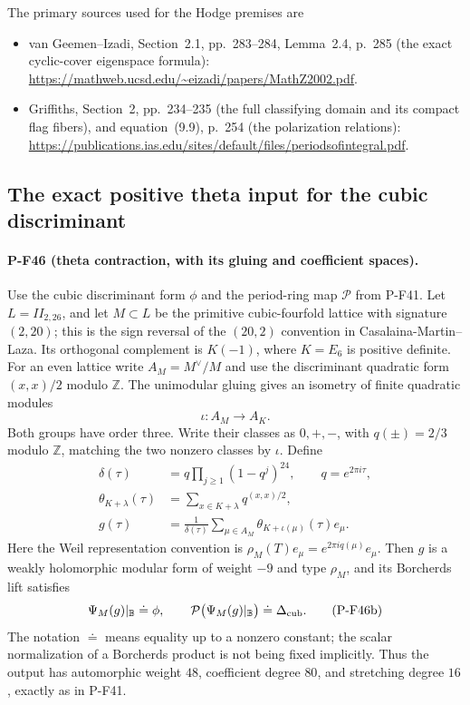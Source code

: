 \documentclass[11pt,a4paper]{article}
\begin{document}
The primary sources used for the Hodge premises are
\begin{itemize}
\item van Geemen--Izadi, Section~2.1, pp.~283--284,
Lemma~2.4, p.~285 (the exact cyclic-cover eigenspace formula):
\url{https://mathweb.ucsd.edu/~eizadi/papers/MathZ2002.pdf}.
\item Griffiths, Section~2, pp.~234--235 (the full classifying
domain and its compact flag fibers), and equation~(9.9),
p.~254 (the polarization relations):
\url{https://publications.ias.edu/sites/default/files/periodsofintegral.pdf}.
\end{itemize}


\subsection{The exact positive theta input for the cubic discriminant}
\label{sec:theta-input}

\paragraph{P-F46 (theta contraction, with its gluing and coefficient spaces).}
Use the cubic discriminant form $\phi$ and the period-ring map
$\mathcal P$ from P-F41. Let $L=II_{2,26}$, and let
$M\subset L$ be the primitive cubic-fourfold lattice with
signature $(2,20)$; this is the sign reversal of the
$(20,2)$ convention in Casalaina-Martin--Laza. Its orthogonal
complement is $K(-1)$, where $K=E_6$ is positive definite.
For an even lattice write $A_M=M^\vee/M$ and use the
discriminant quadratic form $(x,x)/2$ modulo $\mathbb Z$.
The unimodular gluing gives an isometry of finite quadratic
modules
\[
                 \iota:A_M\longrightarrow A_K.
\]
Both groups have order three. Write their classes as
$0,+,-$, with $q(\pm)=2/3$ modulo $\mathbb Z$, matching
the two nonzero classes by $\iota$. Define
\[
 \begin{split}
 \delta(\tau)&=q\prod_{j\ge1}(1-q^j)^{24},
                  \qquad q=e^{2\pi i\tau},\\
 \theta_{K+\lambda}(\tau)
       &=\sum_{x\in K+\lambda}q^{(x,x)/2},\\
 g(\tau)&=\frac1{\delta(\tau)}
       \sum_{\mu\in A_M}\theta_{K+\iota(\mu)}(\tau)e_\mu.
 \end{split}
 \tag{P-F46a}
\]
Here the Weil representation convention is
$\rho_M(T)e_\mu=e^{2\pi i q(\mu)}e_\mu$.
Then $g$ is a weakly holomorphic modular form of weight
$-9$ and type $\rho_M$, and its Borcherds lift satisfies
\[
       \Psi_M(g)|_{\mathbb B}\doteq\phi,
       \qquad
       \mathcal P\bigl(\Psi_M(g)|_{\mathbb B}\bigr)
                   \doteq\Delta_{\rm cub}.
 \tag{P-F46b}
\]
The notation $\doteq$ means equality up to a nonzero
constant; the scalar normalization of a Borcherds product
is not being fixed implicitly. Thus the output has
automorphic weight $48$, coefficient degree $80$, and
stretching degree $16$, exactly as in P-F41.
\end{document}
